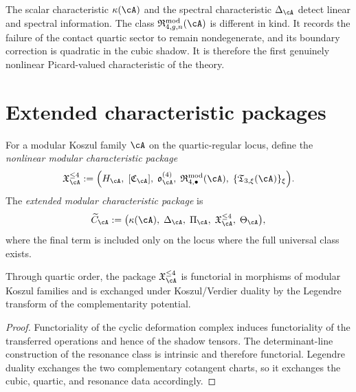 \begin{remark}
\label{rem:nms-why-quartic-resonance-is-new}
The scalar characteristic $\kappa(\cA)$ and the spectral characteristic $\Delta_{\cA}$ detect linear and spectral information. The class $\mathfrak R_{4,g,n}^{\mathrm{mod}}(\cA)$ is different in kind. It records the failure of the contact quartic sector to remain nondegenerate, and its boundary correction is quadratic in the cubic shadow. It is therefore the first genuinely nonlinear Picard-valued characteristic of the theory.
\end{remark}

\section{Extended characteristic packages}
\label{sec:nms-extended-characteristic-packages}

\begin{definition}
\label{def:nms-nonlinear-characteristic-package}
For a modular Koszul family $\cA$ on the quartic-regular locus, define the \emph{nonlinear modular characteristic package}
\[
\mathfrak X_{\cA}^{\le 4}
:=
\Bigl(
H_{\cA},\;
[\mathfrak C_{\cA}],\;
\mathfrak o_{\cA}^{(4)},\;
\mathfrak R_{4,\bullet}^{\mathrm{mod}}(\cA),\;
\{\mathfrak T_{3,\xi}(\cA)\}_\xi
\Bigr).
\]
The \emph{extended modular characteristic package} is
\[
\widetilde C_{\cA}
:=
\bigl(
\kappa(\cA),\;
\Delta_{\cA},\;
\Pi_{\cA},\;
\mathfrak X_{\cA}^{\le 4},\;
\Theta_{\cA}
\bigr),
\]
where the final term is included only on the locus where the full universal class exists.
\end{definition}

\begin{proposition}
\label{prop:nms-functoriality-duality-quartic}
Through quartic order, the package $\mathfrak X_{\cA}^{\le 4}$ is functorial in morphisms of modular Koszul families and is exchanged under Koszul/Verdier duality by the Legendre transform of the complementarity potential.
\end{proposition}

\begin{proof}
Functoriality of the cyclic deformation complex induces functoriality of the transferred operations and hence of the shadow tensors. The determinant-line construction of the resonance class is intrinsic and therefore functorial. Legendre duality exchanges the two complementary cotangent charts, so it exchanges the cubic, quartic, and resonance data accordingly.\qedhere
\end{proof}

